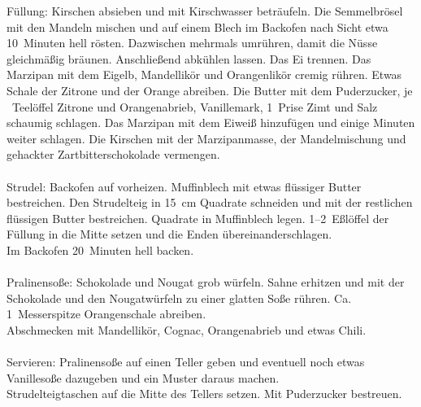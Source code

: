       \begin{zubereitung}
        Füllung: Kirschen absieben und mit Kirschwasser beträufeln. Die
	Semmelbrösel mit den Mandeln mischen und auf einem Blech im Backofen
	nach Sicht etwa 10~Minuten hell rösten. Dazwischen mehrmals umrühren,
	damit die Nüsse gleichmäßig bräunen. Anschließend abkühlen lassen.
	Das Ei trennen. Das Marzipan mit dem Eigelb, Mandellikör und
	Orangenlikör cremig rühren. Etwas Schale der Zitrone und der Orange
	abreiben. Die Butter mit dem Puderzucker, je \breh{}~Teelöffel Zitrone
	und Orangenabrieb, Vanillemark, 1~Prise Zimt und Salz schaumig schlagen.
	Das Marzipan mit dem Eiweiß hinzufügen und einige Minuten weiter
	schlagen. Die Kirschen mit der Marzipanmasse, der Mandelmischung und
	gehackter Zartbitterschokolade vermengen. \\
	\\
	Strudel: Backofen auf  vorheizen. Muffinblech mit etwas
	flüssiger Butter bestreichen. Den Strudelteig in 15~cm Quadrate
	schneiden und mit der restlichen flüssigen Butter bestreichen.
	Quadrate in Muffinblech legen. 1--2~Eßlöffel der Füllung in die Mitte
	setzen und die Enden übereinanderschlagen. \\
	Im Backofen 20~Minuten hell backen. \\
	\\
	Pralinensoße: Schokolade und Nougat grob würfeln. Sahne erhitzen und
	mit der Schokolade und den Nougatwürfeln zu einer glatten Soße rühren.
	Ca. 1~Messerspitze Orangenschale abreiben. \\
	Abschmecken mit Mandellikör, Cognac, Orangenabrieb und etwas Chili. \\
	\\
	Servieren: Pralinensoße auf einen Teller geben und eventuell noch etwas
	Vanillesoße dazugeben und ein Muster daraus machen. \\
	Strudelteigtaschen auf die Mitte des Tellers setzen. Mit Puderzucker
	bestreuen. \\
      \end{zubereitung}


